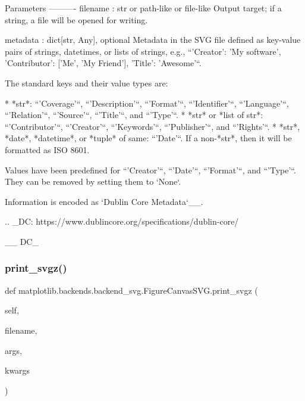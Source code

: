 \begin{DoxyVerb}Parameters
----------
filename : str or path-like or file-like
    Output target; if a string, a file will be opened for writing.

metadata : dict[str, Any], optional
    Metadata in the SVG file defined as key-value pairs of strings,
    datetimes, or lists of strings, e.g., ``{'Creator': 'My software',
    'Contributor': ['Me', 'My Friend'], 'Title': 'Awesome'}``.

    The standard keys and their value types are:

    * *str*: ``'Coverage'``, ``'Description'``, ``'Format'``,
      ``'Identifier'``, ``'Language'``, ``'Relation'``, ``'Source'``,
      ``'Title'``, and ``'Type'``.
    * *str* or *list of str*: ``'Contributor'``, ``'Creator'``,
      ``'Keywords'``, ``'Publisher'``, and ``'Rights'``.
    * *str*, *date*, *datetime*, or *tuple* of same: ``'Date'``. If a
      non-*str*, then it will be formatted as ISO 8601.

    Values have been predefined for ``'Creator'``, ``'Date'``,
    ``'Format'``, and ``'Type'``. They can be removed by setting them
    to `None`.

    Information is encoded as `Dublin Core Metadata`__.

    .. _DC: https://www.dublincore.org/specifications/dublin-core/

    __ DC_
\end{DoxyVerb}
 \mbox{\label{classmatplotlib_1_1backends_1_1backend__svg_1_1FigureCanvasSVG_a78d76684c174c79cef536b8fa4735c2e}} 
\subsubsection{\texorpdfstring{print\+\_\+svgz()}{print\_svgz()}}
{\footnotesize\ttfamily def matplotlib.\+backends.\+backend\+\_\+svg.\+Figure\+Canvas\+S\+V\+G.\+print\+\_\+svgz (\begin{DoxyParamCaption}\item[{}]{self,  }\item[{}]{filename,  }\item[{}]{args,  }\item[{}]{kwargs }\end{DoxyParamCaption})}



